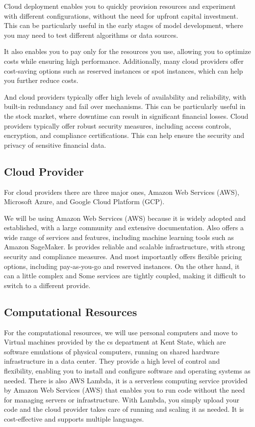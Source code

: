 \documentclass{article}
\begin{document}
Cloud deployment enables you to quickly provision resources and experiment with different configurations, without the need for upfront capital investment. This can be particularly useful in the early stages of model development, where you may need to test different algorithms or data sources.

It also enables you to pay only for the resources you use, allowing you to optimize costs while ensuring high performance. Additionally, many cloud providers offer cost-saving options such as reserved instances or spot instances, which can help you further reduce costs.

And cloud providers typically offer high levels of availability and reliability, with built-in redundancy and fail over mechanisms. This can be particularly useful in the stock market, where downtime can result in significant financial losses. Cloud providers typically offer robust security measures, including access controls, encryption, and compliance certifications. This can help ensure the security and privacy of sensitive financial data.

\subsection{Cloud Provider}
For cloud providers there are three major ones, Amazon Web Services (AWS), Microsoft Azure, and Google Cloud Platform (GCP).

We will be using Amazon Web Services (AWS) because it is widely adopted and established, with a large community and extensive documentation. Also offers a wide range of services and features, including machine learning tools such as Amazon SageMaker. Is provides reliable and scalable infrastructure, with strong security and compliance measures. And most importantly offers flexible pricing options, including pay-as-you-go and reserved instances.
On the other hand, it can a little complex and Some services are tightly coupled, making it difficult to switch to a different provide. 

\subsection{Computational Resources}
For the computational resources, we will use personal computers and move to Virtual machines provided by the cs department at Kent State, which are software emulations of physical computers, running on shared hardware infrastructure in a data center. They provide a high level of control and flexibility, enabling you to install and configure software and operating systems as needed. 
There is also AWS Lambda, it is a serverless computing service provided by Amazon Web Services (AWS) that enables you to run code without the need for managing servers or infrastructure. With Lambda, you simply upload your code and the cloud provider takes care of running and scaling it as needed. It is cost-effective and supports multiple languages. 
\end{document}
